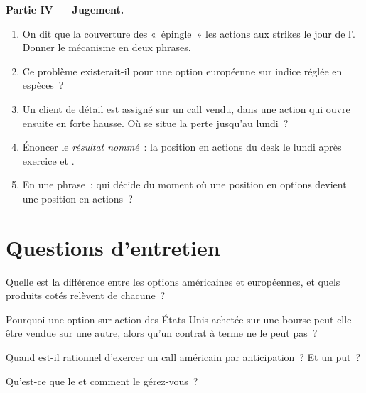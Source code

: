 \begin{problem}
\medskip\noindent\textbf{Partie IV --- Jugement.}
\begin{enumerate}[resume]
\item On dit que la couverture des  «~épingle~» les actions aux
strikes le jour de l'. Donner le mécanisme en deux phrases.
\item Ce problème existerait-il pour une option européenne sur indice réglée en espèces~?
\item Un client de détail est assigné sur un call vendu, dans une action qui
ouvre ensuite en forte hausse. Où se situe la perte jusqu'au lundi~?
\item Énoncer le \emph{résultat nommé}~: la position en actions du desk le lundi
après exercice et .
\item En une phrase~: qui décide du moment où une position en options devient une
position en actions~?
\end{enumerate}
\end{problem}

\section{Questions d'entretien}

\begin{interviewq}\label{iq:m1:option-contracts-and-exchanges:1}
Quelle est la différence entre les options américaines et européennes, et
quels produits cotés relèvent de chacune~?
\end{interviewq}

\begin{interviewq}\label{iq:m1:option-contracts-and-exchanges:2}
Pourquoi une option sur action des États-Unis achetée sur une bourse peut-elle être
vendue sur une autre, alors qu'un contrat à terme ne le peut pas~?
\end{interviewq}

\begin{interviewq}\label{iq:m1:option-contracts-and-exchanges:3}
Quand est-il rationnel d'exercer un call américain par anticipation~? Et un put~?
\end{interviewq}

\begin{interviewq}\label{iq:m1:option-contracts-and-exchanges:4}
Qu'est-ce que le  et comment le gérez-vous~?
\end{interviewq}

